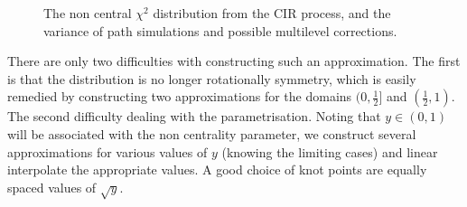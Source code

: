 \documentclass[manuscript,review]{acmart}
\begin{document}
\begin{figure}[htb]
\centering

\hfill
{}\hfill
{}\hfill 
\caption{The non central $ \chi^2 $ distribution from the CIR process, and the variance of path simulations and possible multilevel corrections.}
\label{fig:cir_process}
\end{figure}

There are only two difficulties with constructing such an approximation. The first is that the distribution is no longer rotationally symmetry, which is easily remedied by constructing two approximations for the domains $ (0, \tfrac{1}{2}] $ and $ (\tfrac{1}{2}, 1) $. The second difficulty dealing with the parametrisation. Noting that $ y \in (0, 1) $ will be associated with the non centrality parameter, we construct several approximations for various values of $ y $ (knowing the limiting cases) and linear interpolate the appropriate values. A good choice of knot points are equally spaced values of $ \sqrt{y} $.
\end{document}
